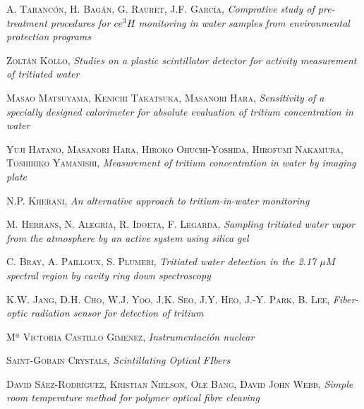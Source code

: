 \begin{thebibliography}{99}
 \textsc{A. Tarancón}, \textsc{H. Bagán}, \textsc{G. Rauret}, \textsc{J.F. García},
\textit{Comprative study of pre-treatment procedures for $ce{^{3}H}$ monitoring in water samples from environmental protection programs}

 \textsc{Zoltán Köllo},
\textit{Studies on a plastic scintillator detector for activity measurement of tritiated water}

 \textsc{Masao Matsuyama}, \textsc{Kenichi Takatsuka}, \textsc{Masanori Hara}, 
\textit{Sensitivity of a specially designed calorimeter for absolute evaluation of tritium concentration in water}

 \textsc{Yuji Hatano}, \textsc{Masanori Hara}, \textsc{Hiroko Ohuchi-Yoshida}, \textsc{Hirofumi Nakamura}, \textsc{Toshihiko Yamanishi},
\textit{Measurement of tritium concentration in water by imaging plate}

\textsc{N.P. Kherani},
\textit{An alternative approach to tritium-in-water monitoring}

 \textsc{M. Herrans}, \textsc{N. Alegría}, \textsc{R. Idoeta}, \textsc{F. Legarda},
\textit{Sampling tritiated water vapor from the atmosphere by an active system using silica gel}

 \textsc{C. Bray}, \textsc{A. Pailloux}, \textsc{S. Plumeri},
\textit{Tritiated water detection in the 2.17 $\mu M$ spectral region by cavity ring down spectroscopy}

 \textsc{K.W. Jang}, \textsc{D.H. Cho}, \textsc{W.J. Yoo}, \textsc{J.K. Seo}, \textsc{J.Y. Heo}, \textsc{J.-Y. Park}, \textsc{B. Lee},
\textit{Fiber-optic radiation sensor for detection of tritium}

 \textsc{Mª Victoria Castillo Gimenez},
\textit{Instrumentación nuclear} 

 \textsc{Saint-Gobain Crystals},
\textit{Scintillating Optical FIbers}

 \textsc{David Sáez-Rodríguez}, \textsc{Kristian Nielson}, \textsc{Ole Bang}, \textsc{David John Webb},
\textit{Simple room temperature method for polymer optical fibre cleaving}


\end{thebibliography}
